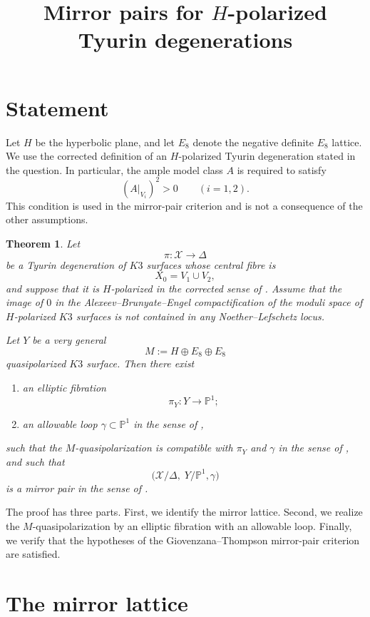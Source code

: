 \documentclass[11pt]{amsart}
\newtheorem{theorem}{Theorem}[section]
\theoremstyle{definition}
\theoremstyle{remark}
\newcommand{\cX}{\mathcal{X}}
\newcommand{\D}{\Delta}
\newcommand{\PP}{\mathbb{P}}
\begin{document}
\title{Mirror pairs for $H$-polarized Tyurin degenerations}
\author{}
\date{}
\maketitle

\section{Statement}

Let $H$ be the hyperbolic plane, and let $E_8$ denote the negative definite
$E_8$ lattice.  We use the corrected definition of an $H$-polarized Tyurin
degeneration stated in the question.  In particular, the ample model class $A$
is required to satisfy
\[
(A|_{V_i})^2>0
\qquad (i=1,2).
\]
This condition is used in the mirror-pair criterion and is not a consequence
of the other assumptions.

\begin{theorem}\label{thm:main}
Let
\[
\pi\colon \cX\longrightarrow \D
\]
be a Tyurin degeneration of $K3$ surfaces whose central fibre is
\[
X_0=V_1\cup V_2,
\]
and suppose that it is $H$-polarized in the corrected sense of
\cite[Definition~3.20]{dfk3slpms}.  Assume that the image of $0$ in the
Alexeev--Brunyate--Engel compactification of the moduli space of
$H$-polarized $K3$ surfaces is not contained in any Noether--Lefschetz locus.

Let $Y$ be a very general
\[
M:=H\oplus E_8\oplus E_8
\]
quasipolarized $K3$ surface.  Then there exist
\begin{enumerate}
\item an elliptic fibration
\[
\pi_Y\colon Y\longrightarrow \PP^1;
\]
\item an allowable loop $\gamma\subset \PP^1$ in the sense of
\cite[Definition~4.11]{dfk3slpms},
\end{enumerate}
such that the $M$-quasipolarization is compatible with $\pi_Y$ and $\gamma$
in the sense of \cite[Definition~4.21]{dfk3slpms}, and such that
\[
\bigl(\cX/\D,\; Y/\PP^1,\gamma\bigr)
\]
is a mirror pair in the sense of \cite[Definition~5.1]{dfk3slpms}.
\end{theorem}

The proof has three parts.  First, we identify the mirror lattice.  Second,
we realize the $M$-quasipolarization by an elliptic fibration with an
allowable loop.  Finally, we verify that the hypotheses of the
Giovenzana--Thompson mirror-pair criterion are satisfied.

\section{The mirror lattice}
\end{document}
